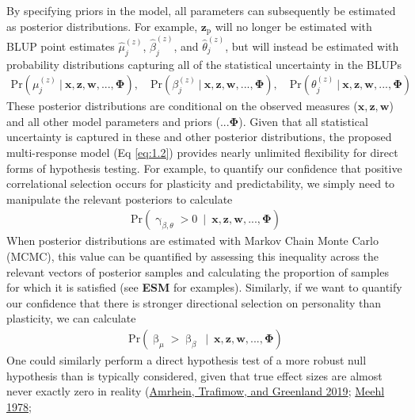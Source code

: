 \documentclass{article}
\begin{document}
By specifying priors in the model, all parameters can subsequently be
estimated as posterior distributions. For example,
\(\boldsymbol{z}_{\boldsymbol{\mathrm{p}}}\) will no longer be estimated
with BLUP point estimates \(\hat{\mu}_j^{(z)}\),
\(\hat{\beta}_j^{(z)}\), and \(\hat{\theta}_j^{(z)}\), but will instead
be estimated with probability distributions capturing all of the
statistical uncertainty in the BLUPs \begin{align*}
\mathrm{Pr}\left( \mu_j^{(z)} \ | \ \boldsymbol{x},\boldsymbol{z},\boldsymbol{w},...,\boldsymbol{\Phi} \right), \quad
\mathrm{Pr}\left( \beta_j^{(z)} \ | \ \boldsymbol{x},\boldsymbol{z},\boldsymbol{w},...,\boldsymbol{\Phi} \right), \quad
\mathrm{Pr}\left( \theta_j^{(z)} \ | \ \boldsymbol{x},\boldsymbol{z},\boldsymbol{w},...,\boldsymbol{\Phi} \right)
\end{align*} These posterior distributions are conditional on the
observed measures (\(\boldsymbol{x},\boldsymbol{z},\boldsymbol{w}\)) and
all other model parameters and priors (\(...\boldsymbol{\Phi}\)). Given
that all statistical uncertainty is captured in these and other
posterior distributions, the proposed multi-response model (Eq
\ref{eq:1.2}) provides nearly unlimited flexibility for direct forms of
hypothesis testing. For example, to quantify our confidence that
positive correlational selection occurs for plasticity and
predictability, we simply need to manipulate the relevant posteriors to
calculate \begin{align*}
\mathrm{Pr}\left( \upgamma _ {\beta , \theta}  > 0 \ \mid \ \boldsymbol{x},\boldsymbol{z},\boldsymbol{w},...,\boldsymbol{\Phi} \right)
\end{align*} When posterior distributions are estimated with Markov
Chain Monte Carlo (MCMC), this value can be quantified by assessing this
inequality across the relevant vectors of posterior samples and
calculating the proportion of samples for which it is satisfied (see
\textbf{ESM} for examples). Similarly, if we want to quantify our
confidence that there is stronger directional selection on personality
than plasticity, we can calculate \begin{align*}
\mathrm{Pr}\left( \upbeta _ \mu  >  \upbeta _ \beta \ \mid \ \boldsymbol{x},\boldsymbol{z},\boldsymbol{w},...,\boldsymbol{\Phi} \right)
\end{align*} One could similarly perform a direct hypothesis test of a
more robust null hypothesis than is typically considered, given that
true effect sizes are almost never exactly zero in reality
(\protect\hyperlink{ref-Amrhein2019}{Amrhein, Trafimow, and Greenland
2019}; \protect\hyperlink{ref-Meehl1978}{Meehl 1978};
\end{document}

